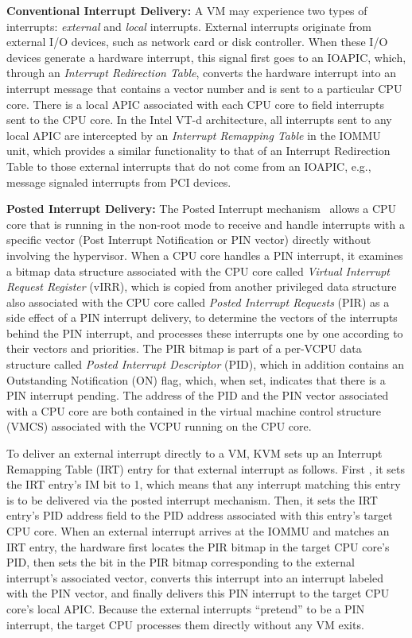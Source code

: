 {\bf Conventional Interrupt Delivery:}
A VM may experience two types of interrupts: {\em external} and {\em local} interrupts.
External interrupts originate from external I/O devices, such as network card or disk controller.
When these I/O devices generate a hardware interrupt, this signal first goes to an IOAPIC, which, through an {\em Interrupt Redirection Table},
converts the hardware interrupt into an interrupt message that contains a vector number and is sent to a particular CPU core.
There is a local APIC associated with each CPU core to field interrupts sent to the CPU core.
In the Intel VT-d architecture, all interrupts sent to any local APIC are intercepted by  an {\em Interrupt Remapping Table} in the IOMMU unit,
which provides a similar functionality to that of an Interrupt Redirection Table
to those external interrupts that do not come from an IOAPIC, e.g., message signaled interrupts from PCI devices.

{\bf Posted Interrupt Delivery:}
The Posted Interrupt mechanism~\cite{intelvtd-paper,intelvtd-manual} allows a CPU core that is running in the non-root mode to receive and handle interrupts with a specific vector
(Post Interrupt Notification or PIN vector) directly without involving the hypervisor.
When a CPU core handles a PIN interrupt, it examines a bitmap data structure associated with the CPU core called {\em Virtual Interrupt Request Register} (vIRR),
which is copied from another privileged data structure also associated with the CPU core called {\em Posted Interrupt Requests} (PIR) as a side effect of a PIN interrupt delivery,
to determine the vectors of the interrupts behind the PIN interrupt, and processes these interrupts one by one according to their vectors and priorities.
The PIR bitmap is part of a per-VCPU data structure called {\em Posted Interrupt Descriptor} (PID), which in addition contains an Outstanding Notification (ON) flag, which, when set, indicates that there is a PIN interrupt pending.
The address of the PID and the PIN vector associated with a CPU core are both contained in the virtual machine control structure (VMCS) associated with the VCPU running on the CPU core.


To deliver an external interrupt directly to a VM, KVM sets up an Interrupt Remapping Table (IRT) entry for that external interrupt as follows.
First , it sets the IRT entry's IM bit to 1, which means that any interrupt matching this entry is to be delivered via the posted interrupt mechanism.
Then, it sets the IRT entry's PID address field to the PID address associated with this entry's target CPU core.
When an external interrupt arrives at the IOMMU and matches an IRT entry, the
hardware first locates the PIR bitmap in the target CPU core's PID, then sets the bit in the PIR bitmap corresponding to the external interrupt's associated vector,
converts this interrupt into an interrupt labeled with the PIN vector, and finally delivers this PIN interrupt to the target CPU core's local APIC.
Because the external interrupts ``pretend'' to be a PIN interrupt, the target CPU processes them directly without any VM exits.

